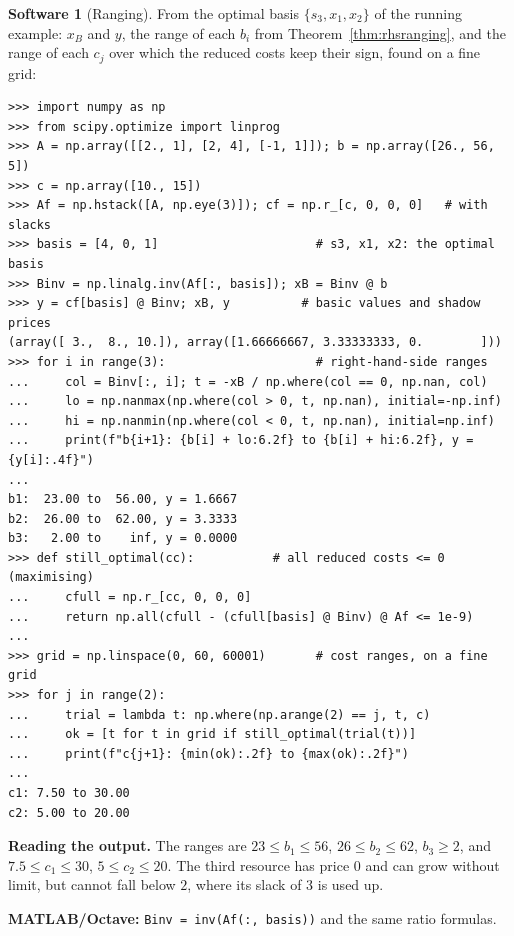 \documentclass[11pt,a4paper]{article}
\numberwithin{equation}{section}
\theoremstyle{definition}
\newtheorem{software}[thm]{Software}
\begin{document}
\begin{software}[Ranging]
\label{sw:ranging}
From the optimal basis $\{s_3, x_1, x_2\}$ of the running example: $x_B$ and $y$, the range of each $b_i$ from Theorem~\ref{thm:rhsranging}, and the range of each $c_j$ over which the reduced costs keep their sign, found on a fine grid:
{\small\begin{verbatim}
>>> import numpy as np
>>> from scipy.optimize import linprog
>>> A = np.array([[2., 1], [2, 4], [-1, 1]]); b = np.array([26., 56, 5])
>>> c = np.array([10., 15])
>>> Af = np.hstack([A, np.eye(3)]); cf = np.r_[c, 0, 0, 0]   # with slacks
>>> basis = [4, 0, 1]                      # s3, x1, x2: the optimal basis
>>> Binv = np.linalg.inv(Af[:, basis]); xB = Binv @ b
>>> y = cf[basis] @ Binv; xB, y          # basic values and shadow prices
(array([ 3.,  8., 10.]), array([1.66666667, 3.33333333, 0.        ]))
>>> for i in range(3):                     # right-hand-side ranges
...     col = Binv[:, i]; t = -xB / np.where(col == 0, np.nan, col)
...     lo = np.nanmax(np.where(col > 0, t, np.nan), initial=-np.inf)
...     hi = np.nanmin(np.where(col < 0, t, np.nan), initial=np.inf)
...     print(f"b{i+1}: {b[i] + lo:6.2f} to {b[i] + hi:6.2f}, y = {y[i]:.4f}")
...
b1:  23.00 to  56.00, y = 1.6667
b2:  26.00 to  62.00, y = 3.3333
b3:   2.00 to    inf, y = 0.0000
>>> def still_optimal(cc):           # all reduced costs <= 0 (maximising)
...     cfull = np.r_[cc, 0, 0, 0]
...     return np.all(cfull - (cfull[basis] @ Binv) @ Af <= 1e-9)
...
>>> grid = np.linspace(0, 60, 60001)       # cost ranges, on a fine grid
>>> for j in range(2):
...     trial = lambda t: np.where(np.arange(2) == j, t, c)
...     ok = [t for t in grid if still_optimal(trial(t))]
...     print(f"c{j+1}: {min(ok):.2f} to {max(ok):.2f}")
...
c1: 7.50 to 30.00
c2: 5.00 to 20.00
\end{verbatim}}
\textbf{Reading the output.} The ranges are $23 \leq b_1 \leq 56$, $26 \leq b_2 \leq 62$, $b_3 \geq 2$, and $7.5 \leq c_1 \leq 30$, $5 \leq c_2 \leq 20$. The third resource has price $0$ and can grow without limit, but cannot fall below $2$, where its slack of $3$ is used up.

\textbf{MATLAB/Octave:} \texttt{Binv = inv(Af(:, basis))} and the same ratio formulas.
\end{software}
\end{document}
